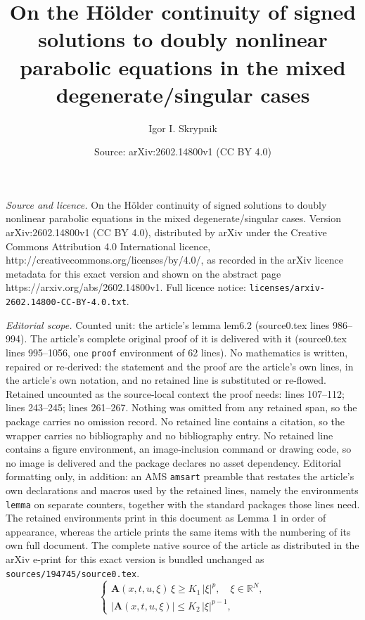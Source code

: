 \documentclass[10pt,a4paper]{amsart}
\title{On the H\"{o}lder continuity of signed solutions to doubly nonlinear parabolic equations in the mixed degenerate/singular cases}
\author{Igor I. Skrypnik}
\date{Source: arXiv:2602.14800v1 (CC BY 4.0)}
\begin{document}
\maketitle

\noindent\emph{Source and licence.} On the H\"{o}lder continuity of signed solutions to doubly nonlinear parabolic equations in the mixed degenerate/singular cases. Version arXiv:2602.14800v1 (CC BY 4.0), distributed by arXiv under the Creative Commons Attribution 4.0 International licence, http://creativecommons.org/licenses/by/4.0/, as recorded in the arXiv licence metadata for this exact version and shown on the abstract page https://arxiv.org/abs/2602.14800v1. Full licence notice: \texttt{licenses/arxiv-2602.14800-CC-BY-4.0.txt}.\par\smallskip

\noindent\textit{Editorial scope.} Counted unit: the article's lemma lem6.2 (source0.tex lines 986--994). The article's complete original proof of it is delivered with it (source0.tex lines 995--1056, one \texttt{proof} environment of 62 lines). No mathematics is written, repaired or re-derived: the statement and the proof are the article's own lines, in the article's own notation, and no retained line is substituted or re-flowed.  Retained uncounted as the source-local context the proof needs: lines 107--112; lines 243--245; lines 261--267.  Nothing was omitted from any retained span, so the package carries no omission record.  No retained line contains a citation, so the wrapper carries no bibliography and no bibliography entry.  No retained line contains a figure environment, an image-inclusion command or drawing code, so no image is delivered and the package declares no asset dependency.  Editorial formatting only, in addition: an AMS \texttt{amsart} preamble that restates the article's own declarations and macros used by the retained lines, namely the environments \texttt{lemma} on separate counters, together with the standard packages those lines need.  The retained environments print in this document as Lemma 1 in order of appearance, whereas the article prints the same items with the numbering of its own full document.  The complete native source of the article as distributed in the arXiv e-print for this exact version is bundled unchanged as \texttt{sources/194745/source0.tex}.
 \begin{equation}\label{eq1.2}
 \begin{cases}
 \mathbf{A}(x, t, u, \xi)\,\xi\geqslant K_1\,|\xi|^p,\quad \xi\in \mathbb{R}^N,\\
 |\mathbf{A}(x, t, u, \xi)|\leqslant K_2\,|\xi|^{p-1},
 \end{cases}
 \end{equation}
\end{document}
